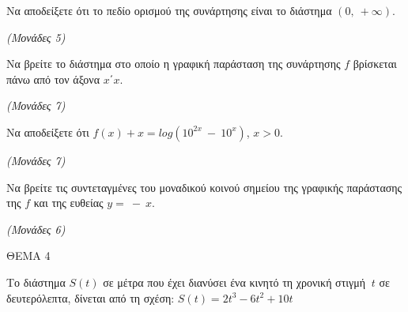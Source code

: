 \documentclass[11pt,a4paper,twoside]{book}
\newcommand{\monades}[1]{\hfill \textit{(Μονάδες #1)}}
\begin{document}
\begin{alist}
\item Να αποδείξετε ότι το πεδίο ορισμού της συνάρτησης είναι το διάστημα $(0,\  + \infty)$.

\monades{5}

\item Να βρείτε το διάστημα στο οποίο η γραφική παράσταση της συνάρτησης $f$ βρίσκεται πάνω από τον άξονα $x΄x$.

\monades{7}

\item Να αποδείξετε ότι $f(x) + x = log(10^{2x}\  - \ 10^{x})$, $x > 0$.

\monades{7}

\item Να βρείτε τις συντεταγμένες του μοναδικού κοινού σημείου της γραφικής παράστασης της $f$ και της ευθείας $y = \  - \ x$.

\monades{6}
\end{alist}

\vspace{4mm}

ΘΕΜΑ 4

Το διάστημα $S(t)$ σε μέτρα που έχει διανύσει ένα κινητό τη χρονική στιγμή $\ t$ σε δευτερόλεπτα, δίνεται από τη σχέση: $S(t) = 2t^{3} - 6t^{2} + 10t$
\end{document}
